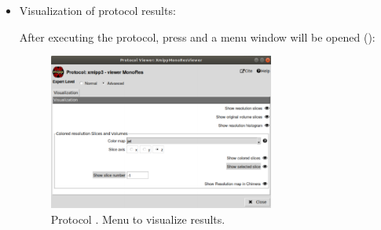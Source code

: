 \begin{itemize}
  \item Visualization of protocol results:
  
  After executing the protocol, press  and a menu window will be opened ():
  
  \begin{figure}[H]
     \centering 
     \captionsetup{width=.7\linewidth} 
     \includegraphics[width=0.70\textwidth]{Images_appendix/Fig209.pdf}
     \caption{Protocol . Menu to visualize results.}
     \label{fig:app_localMonoRes_2}
    \end{figure}
    

\end{itemize}
